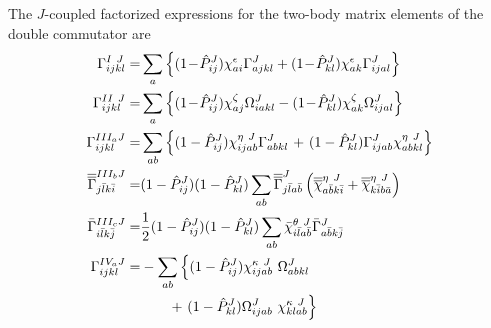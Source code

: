 \documentclass[11pt]{article}
\newcommand{\MyRomanNum}[1]{%
\ifcase#1\or I\or II\or III\or IV\or V\or VI\or VII\or VIII\or IX\or X\else #1\fi}
\begin{document}
The $J$-coupled factorized expressions for the two-body matrix elements of the double commutator are
 \begin{subequations}\allowdisplaybreaks[4]\label{Jcoupled_Factorized_DoubleCommutator_twobody}
\begin{align}
\Gamma^{\MyRomanNum{1} ~ J}_{ijkl}  =&  \sum_{a} \left\{ (1\! -\! \hat P^{J}_{ij} )   \chi^{\epsilon}_{ai} \Gamma^{J}_{ajkl} %
+ (1\! -\! \hat P^{J}_{kl} )   \chi^{\epsilon}_{ak} \Gamma^{J}_{ijal} \right\} \\
\Gamma^{\MyRomanNum{2} ~ J}_{ijkl}  =&  \sum_{a}
\left\{ (1 \!-\! \hat P^{J}_{ij} )    \chi^{\zeta}_{aj}  \Omega^{J}_{iakl} 
-(1\! -\! \hat P^{J}_{kl} )   \chi^{\zeta}_{ak}  \Omega^{J}_{ijal} \right\}
\\
\Gamma^{\MyRomanNum{3}_a J}_{ijkl}  =&   %
\sum_{ab} \left\{  (1 - \hat P^{J}_{ij} )  \chi^{\eta~J}_{ijab}  \Gamma^{J}_{abkl} \right. %
+  \left. (1 - \hat P^{J}_{kl} ) \Gamma^{J}_{ijab} \chi^{\eta~J}_{a b k l} \right\}\\
\overline{\overline{ \Gamma}}^{\MyRomanNum{3}_bJ}_{j \bar l k \bar i} =& (1 - \hat P^{J}_{ij} )  (1 - \hat P^{J}_{kl} ) %
\sum_{ab} \overline{\overline{ \Gamma}}^{J}_{j \bar l a \bar b}  \left(   \overline{\overline{\chi}}^{\eta~J}_{ a \bar b k \bar i} 
  + \overline{\overline{ \chi}}^{\eta~J}_{k \bar i  b \bar a}  \right) \\ 
\bar \Gamma^{\MyRomanNum{3}_c J}_{i \bar l k \bar j}  =& 
\frac{1}{2} (1 - \hat P^{J}_{ij} )  (1 - \hat P^{J}_{kl} ) \sum_{ab}  \bar \chi^{\theta~J}_{i\bar l a \bar b}  \bar \Gamma^{J}_{a \bar b k \bar j}
\\
%
\Gamma^{\MyRomanNum{4}_a J}_{ijkl}  =&
-\sum_{ab} \left\{
(1 - \hat P^{J}_{ij} ) \chi^{\kappa~J}_{ijab} ~ \Omega^{J}_{abkl}    \right.  \nonumber \\
&\hspace{2em}+  \left. (1 - \hat P^{J}_{kl} ) \Omega^{J}_{ijab} ~ \chi^{\kappa~J}_{klab}  \right\} \\

\end{align}
\end{subequations}
\end{document}
